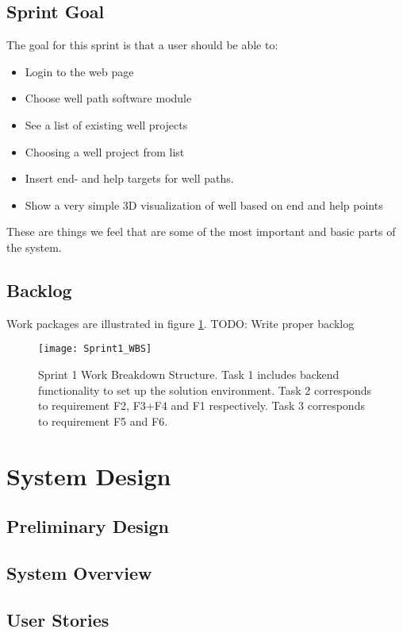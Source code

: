 \documentclass{report}
\begin{document}
\subsection{Sprint Goal} \label{subsec:sprint_goal1}
The goal for this sprint is that a user should be able to:
\begin{itemize}
\item Login to the web page 
\item Choose well path software module 
\item See a list of existing well projects
\item Choosing a well project from list
\item Insert end- and help targets for well paths.
\item Show a very simple 3D visualization of well based on end and help points
\end{itemize}
These are things we feel that are some of the most important and basic parts of the system.
\subsection{Backlog} \label{subsec:backlog1} %
Work packages are illustrated in figure \ref{fig:sprint1_WBS}.
TODO: Write proper backlog
\begin{figure}
    \centering
    \texttt{[image: Sprint1\_WBS]}
    \caption{Sprint 1 Work Breakdown Structure. Task 1 includes backend functionality to set up the solution environment. Task 2 corresponds to requirement F2, F3+F4 and F1 respectively. Task 3 corresponds to requirement F5 and F6.  \label{fig:sprint1_WBS}}
\end{figure}
\newpage
\section{System Design} \label{sec:system:_design1}
\subsection{Preliminary Design} \label{subsec:prelim_design1}
\subsection{System Overview} \label{subsec:sys_overview1}
\subsection{User Stories} \label{subsec:user_stories1}
\newpage
\end{document}
